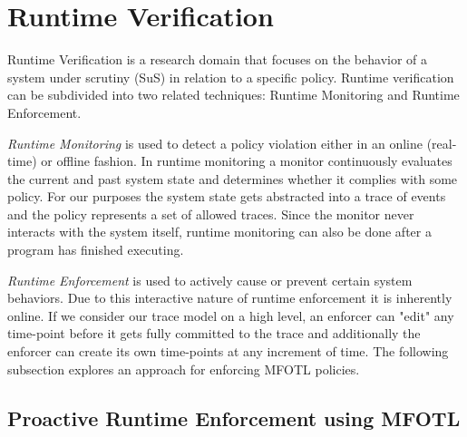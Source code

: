 \section{Runtime Verification}
\label{section:runtime-verification}

Runtime Verification is a research domain that
focuses on the behavior of a system under scrutiny (SuS)
in relation to a specific policy.
Runtime verification can be subdivided into two related techniques: Runtime Monitoring and Runtime Enforcement.

\emph{Runtime Monitoring} is used to detect a policy violation either in an
online (real-time) or offline fashion.
In runtime monitoring a monitor continuously evaluates the current and past
system state and determines whether it complies with some policy.
For our purposes the system state gets abstracted into a trace of events
and the policy represents a set of allowed traces.
Since the monitor never interacts with the system itself, runtime
monitoring can also be done after a program has finished executing.

\emph{Runtime Enforcement}
is used to actively cause or prevent certain system behaviors.
Due to this interactive nature of runtime enforcement it is inherently online.
If we consider our trace model on a high level, an enforcer can "edit" any
time-point before it gets fully committed to the trace and additionally
the enforcer can create its own time-points at any increment of time.
The following subsection explores an approach for enforcing MFOTL policies.

\subsection{Proactive Runtime Enforcement using MFOTL}
\label{subsection:proactive-runtime-enforcement}

